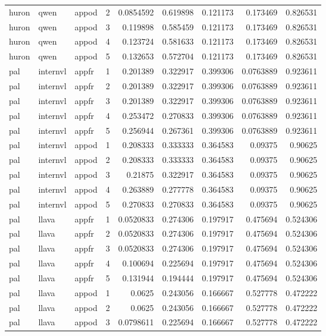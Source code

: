\begin{longtable}{lllrrrrrr}
huron & qwen & appod & 2 & 0.0854592 & 0.619898 & 0.121173 & 0.173469 & 0.826531 \\
huron & qwen & appod & 3 & 0.119898 & 0.585459 & 0.121173 & 0.173469 & 0.826531 \\
huron & qwen & appod & 4 & 0.123724 & 0.581633 & 0.121173 & 0.173469 & 0.826531 \\
huron & qwen & appod & 5 & 0.132653 & 0.572704 & 0.121173 & 0.173469 & 0.826531 \\
pal & internvl & appfr & 1 & 0.201389 & 0.322917 & 0.399306 & 0.0763889 & 0.923611 \\
pal & internvl & appfr & 2 & 0.201389 & 0.322917 & 0.399306 & 0.0763889 & 0.923611 \\
pal & internvl & appfr & 3 & 0.201389 & 0.322917 & 0.399306 & 0.0763889 & 0.923611 \\
pal & internvl & appfr & 4 & 0.253472 & 0.270833 & 0.399306 & 0.0763889 & 0.923611 \\
pal & internvl & appfr & 5 & 0.256944 & 0.267361 & 0.399306 & 0.0763889 & 0.923611 \\
pal & internvl & appod & 1 & 0.208333 & 0.333333 & 0.364583 & 0.09375 & 0.90625 \\
pal & internvl & appod & 2 & 0.208333 & 0.333333 & 0.364583 & 0.09375 & 0.90625 \\
pal & internvl & appod & 3 & 0.21875 & 0.322917 & 0.364583 & 0.09375 & 0.90625 \\
pal & internvl & appod & 4 & 0.263889 & 0.277778 & 0.364583 & 0.09375 & 0.90625 \\
pal & internvl & appod & 5 & 0.270833 & 0.270833 & 0.364583 & 0.09375 & 0.90625 \\
pal & llava & appfr & 1 & 0.0520833 & 0.274306 & 0.197917 & 0.475694 & 0.524306 \\
pal & llava & appfr & 2 & 0.0520833 & 0.274306 & 0.197917 & 0.475694 & 0.524306 \\
pal & llava & appfr & 3 & 0.0520833 & 0.274306 & 0.197917 & 0.475694 & 0.524306 \\
pal & llava & appfr & 4 & 0.100694 & 0.225694 & 0.197917 & 0.475694 & 0.524306 \\
pal & llava & appfr & 5 & 0.131944 & 0.194444 & 0.197917 & 0.475694 & 0.524306 \\
pal & llava & appod & 1 & 0.0625 & 0.243056 & 0.166667 & 0.527778 & 0.472222 \\
pal & llava & appod & 2 & 0.0625 & 0.243056 & 0.166667 & 0.527778 & 0.472222 \\
pal & llava & appod & 3 & 0.0798611 & 0.225694 & 0.166667 & 0.527778 & 0.472222 \\

\end{longtable}
